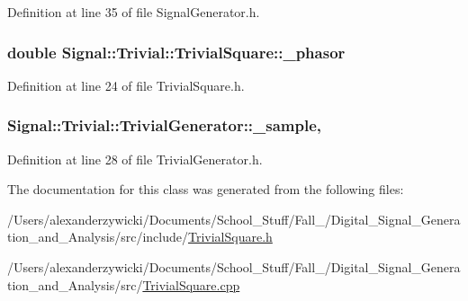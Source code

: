 Definition at line 35 of file Signal\+Generator.\+h.

\hypertarget{classSignal_1_1Trivial_1_1TrivialSquare_a58215de8771ac7bbe9175f3f8d6fd27e}{
\subsubsection[{\+\_\+phasor}]{\setlength{\rightskip}{0pt plus 5cm}double Signal\+::\+Trivial\+::\+Trivial\+Square\+::\+\_\+phasor\hspace{0.3cm}{\ttfamily [protected]}}}\label{classSignal_1_1Trivial_1_1TrivialSquare_a58215de8771ac7bbe9175f3f8d6fd27e}


Definition at line 24 of file Trivial\+Square.\+h.

\hypertarget{classSignal_1_1Trivial_1_1TrivialGenerator_a2e43e1ae605338b92e48974a681866e9}{
\subsubsection[{\+\_\+sample}]{ Signal\+::\+Trivial\+::\+Trivial\+Generator\+::\+\_\+sample\hspace{0.3cm}{\ttfamily [protected]}, {\ttfamily [inherited]}}}\label{classSignal_1_1Trivial_1_1TrivialGenerator_a2e43e1ae605338b92e48974a681866e9}


Definition at line 28 of file Trivial\+Generator.\+h.



The documentation for this class was generated from the following files\+:\begin{DoxyCompactItemize}
\item 
/\+Users/alexanderzywicki/\+Documents/\+School\+\_\+\+Stuff/\+Fall\+\_/\+Digital\+\_\+\+Signal\+\_\+\+Generation\+\_\+and\+\_\+\+Analysis/src/include/\hyperlink{TrivialSquare_8h}{Trivial\+Square.\+h}\item 
/\+Users/alexanderzywicki/\+Documents/\+School\+\_\+\+Stuff/\+Fall\+\_/\+Digital\+\_\+\+Signal\+\_\+\+Generation\+\_\+and\+\_\+\+Analysis/src/\hyperlink{TrivialSquare_8cpp}{Trivial\+Square.\+cpp}\end{DoxyCompactItemize}
